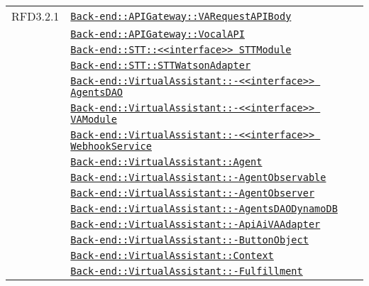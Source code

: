 \begin{longtable}{|>{\centering}m{3cm}|m{10cm}<{\centering}|}
RFD3.2.1 & \hyperref[Back-end::APIGateway::VARequestAPIBody]{\texttt{Back-end::APIGateway::VARequestAPIBody}}\\
& \hyperref[Back-end::APIGateway::VocalAPI]{\texttt{Back-end::APIGateway::VocalAPI}}\\
& \hyperref[Back-end::STT::<<interface>> STTModule]{\texttt{Back-end::STT::<<interface>> STTModule}}\\
& \hyperref[Back-end::STT::STTWatsonAdapter]{\texttt{Back-end::STT::STTWatsonAdapter}}\\
& \hyperref[Back-end::VirtualAssistant::<<interface>> AgentsDAO]{\texttt{Back-end::VirtualAssistant::-\linebreak <<interface>> AgentsDAO}}\\
& \hyperref[Back-end::VirtualAssistant::<<interface>> VAModule]{\texttt{Back-end::VirtualAssistant::-\linebreak <<interface>> VAModule}}\\
& \hyperref[Back-end::VirtualAssistant::<<interface>> WebhookService]{\texttt{Back-end::VirtualAssistant::-\linebreak <<interface>> WebhookService}}\\
& \hyperref[Back-end::VirtualAssistant::Agent]{\texttt{Back-end::VirtualAssistant::Agent}}\\
& \hyperref[Back-end::VirtualAssistant::AgentObservable]{\texttt{Back-end::VirtualAssistant::-\linebreak AgentObservable}}\\
& \hyperref[Back-end::VirtualAssistant::AgentObserver]{\texttt{Back-end::VirtualAssistant::-\linebreak AgentObserver}}\\
& \hyperref[Back-end::VirtualAssistant::AgentsDAODynamoDB]{\texttt{Back-end::VirtualAssistant::-\linebreak AgentsDAODynamoDB}}\\
& \hyperref[Back-end::VirtualAssistant::ApiAiVAAdapter]{\texttt{Back-end::VirtualAssistant::-\linebreak ApiAiVAAdapter}}\\
& \hyperref[Back-end::VirtualAssistant::ButtonObject]{\texttt{Back-end::VirtualAssistant::-\linebreak ButtonObject}}\\
& \hyperref[Back-end::VirtualAssistant::Context]{\texttt{Back-end::VirtualAssistant::Context}}\\
& \hyperref[Back-end::VirtualAssistant::Fulfillment]{\texttt{Back-end::VirtualAssistant::-\linebreak Fulfillment}}\\

\end{longtable}
